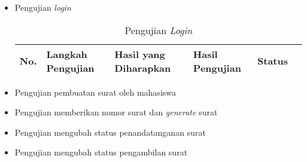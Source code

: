 \begin{itemize}
	\item Pengujian \textit{login}
	\begin{table}[H]
	\centering
	\caption{Pengujian \textit{Login}}
	\label{pengujian_login}
	\begin{tabular}{|l|l|l|l|l|l|}
	\hline
	\textbf{No.}&\textbf{Langkah Pengujian}&\textbf{Hasil yang Diharapkan}&\textbf{Hasil Pengujian}&\textbf{Status}\\ \hline	
	\end{tabular}
	\end{table}	
	
	\item Pengujian pembuatan surat oleh mahasiswa
	\item Pengujian memberikan nomor surat dan \textit{generate} surat
	\item Pengujian mengubah status penandatanganan surat
	\item Pengujian mengubah status pengambilan surat
\end{itemize}